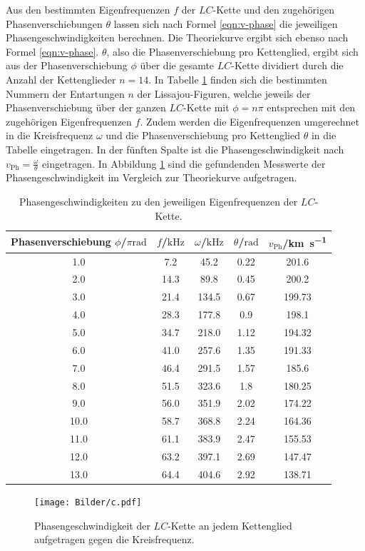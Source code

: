 Aus den bestimmten Eigenfrequenzen $f$ der $LC$-Kette und den zugehörigen Phasenverschiebungen $\theta$ lassen sich nach Formel \eqref{eqn:v-phase} die jeweiligen Phasengeschwindigkeiten berechnen.
Die Theoriekurve ergibt sich ebenso nach Formel \eqref{eqn:v-phase}.
$\theta$, also die Phasenverschiebung pro Kettenglied, ergibt sich aus der Phasenverschiebung $\phi$ über die gesamte $LC$-Kette dividiert durch die Anzahl der Kettenglieder $n=14$.
In Tabelle \ref{tab:c} finden sich die bestimmten Nummern der Entartungen $n$ der Lissajou-Figuren, welche jeweils der Phasenverschiebung über der ganzen $LC$-Kette mit $\phi=n\pi$ entsprechen mit den zugehörigen Eigenfrequenzen $f$.
Zudem werden die Eigenfrequenzen umgerechnet in die Kreisfrequenz $\omega$ und die Phasenverschiebung pro Kettenglied $\theta$ in die Tabelle eingetragen.
In der fünften Spalte ist die Phasengeschwindigkeit nach $v_{\mathrm{Ph}}=\frac{\omega}{\theta}$ eingetragen.
In Abbildung \ref{fig:plotc} sind die gefundenden Messwerte der Phasengeschwindigkeit im Vergleich zur Theoriekurve aufgetragen.
\begin{table}
  \caption{Phasengeschwindigkeiten zu den jeweiligen Eigenfrequenzen der $LC$-Kette.}
\label{tab:c}
\centering
\begin{tabular}{ccccc}
\toprule
Phasenverschiebung $\phi$/$\pi\si{\radian}$ & $f$/$\si{\kilo\Hz}$ & $\omega$/$\si{\kilo\Hz}$ & $\theta$/$\si{\radian}$ & $v_{\mathrm{Ph}}$/\si{\kilo\metre\per\second} \\
\midrule
1.0 & 7.2 & 45.2 & 0.22 & 201.6 \\
2.0 & 14.3 & 89.8 & 0.45 & 200.2 \\
3.0 & 21.4 & 134.5 & 0.67 & 199.73 \\
4.0 & 28.3 & 177.8 & 0.9 & 198.1 \\
5.0 & 34.7 & 218.0 & 1.12 & 194.32 \\
6.0 & 41.0 & 257.6 & 1.35 & 191.33 \\
7.0 & 46.4 & 291.5 & 1.57 & 185.6 \\
8.0 & 51.5 & 323.6 & 1.8 & 180.25 \\
9.0 & 56.0 & 351.9 & 2.02 & 174.22 \\
10.0 & 58.7 & 368.8 & 2.24 & 164.36 \\
11.0 & 61.1 & 383.9 & 2.47 & 155.53 \\
12.0 & 63.2 & 397.1 & 2.69 & 147.47 \\
13.0 & 64.4 & 404.6 & 2.92 & 138.71 \\
\bottomrule
\end{tabular}
\end{table}
\begin{figure}
  \centering
 \texttt{[image: Bilder/c.pdf]}
  \caption{Phasengeschwindigkeit der $LC$-Kette an jedem Kettenglied aufgetragen gegen die Kreisfrequenz.}
  \label{fig:plotc}
\end{figure}
\FloatBarrier
